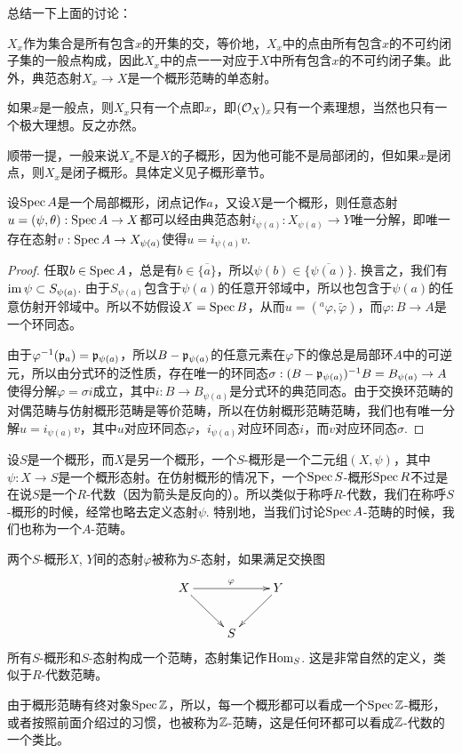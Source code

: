 总结一下上面的讨论：

\begin{pro}
$X_x$作为集合是所有包含$x$的开集的交，等价地，$X_x$中的点由所有包含$x$的不可约闭子集的一般点构成，因此$X_x$中的点一一对应于$X$中所有包含$x$的不可约闭子集。此外，典范态射$X_x\to X$是一个概形范畴的单态射。
\end{pro}

如果$x$是一般点，则$X_x$只有一个点即$x$，即$(\mathcal{O}_X)_x$只有一个素理想，当然也只有一个极大理想。反之亦然。

顺带一提，一般来说$X_x$不是$X$的子概形，因为他可能不是局部闭的，但如果$x$是闭点，则$X_x$是闭子概形。具体定义见子概形章节。

\begin{pro}\label{pro:4.6}
设$\operatorname{Spec} A$是一个局部概形，闭点记作$a$，又设$X$是一个概形，则任意态射$u=(\psi,\theta):\operatorname{Spec} A\to X$都可以经由典范态射$i_{\psi(a)}:X_{\psi(a)}\to Y$唯一分解，即唯一存在态射$v:\operatorname{Spec} A\to X_{\psi(a)}$使得$u=i_{\psi(a)}v$. 
\end{pro}

\begin{proof}
任取$b\in \operatorname{Spec} A$，总是有$b\in\overline{\{a\}}$，所以$\psi(b)\in \overline{\{\psi(a)\}}$. 换言之，我们有$\operatorname{im} \psi\subset S_{\psi(a)}$. 由于$S_{\psi(a)}$包含于$\psi(a)$的任意开邻域中，所以也包含于$\psi(a)$的任意仿射开邻域中。所以不妨假设$X=\operatorname{Spec} B$，从而$u=({}^a\varphi,\widetilde{\varphi})$，而$\varphi:B\to A$是一个环同态。

由于$\varphi^{-1}(\mathfrak{p}_a)=\mathfrak{p}_{\psi(a)}$，所以$B-\mathfrak{p}_{\psi(a)}$的任意元素在$\varphi$下的像总是局部环$A$中的可逆元，所以由分式环的泛性质，存在唯一的环同态$\sigma:(B-\mathfrak{p}_{\psi(a)})^{-1}B=B_{\psi(a)}\to A$使得分解$\varphi=\sigma i$成立，其中$i:B\to B_{\psi(a)}$是分式环的典范同态。由于交换环范畴的对偶范畴与仿射概形范畴是等价范畴，所以在仿射概形范畴范畴，我们也有唯一分解$u=i_{\psi(a)}v$，其中$u$对应环同态$\varphi$，$i_{\psi(a)}$对应环同态$i$，而$v$对应环同态$\sigma$.
\end{proof}

\begin{para}[$S$-概形]
设$S$是一个概形，而$X$是另一个概形，一个$S$-概形是一个二元组$(X,\psi)$，其中$\psi:X\to S$是一个概形态射。在仿射概形的情况下，一个$\operatorname{Spec} S$-概形$\operatorname{Spec} R$不过是在说$S$是一个$R$-代数（因为箭头是反向的）。所以类似于称呼$R$-代数，我们在称呼$S$-概形的时候，经常也略去定义态射$\psi$. 特别地，当我们讨论$\operatorname{Spec} A$-范畴的时候，我们也称为一个$A$-范畴。

两个$S$-概形$X$, $Y$间的态射$\varphi$被称为$S$-态射，如果满足交换图
\[
	\xymatrix{
	X\ar[rr]^\varphi \ar[rd]&&Y\ar[ld]\\
	&S&
	}
\]
所有$S$-概形和$S$-态射构成一个范畴，态射集记作$\operatorname{Hom}_S$. 这是非常自然的定义，类似于$R$-代数范畴。

由于概形范畴有终对象$\operatorname{Spec} \mathbb{Z}$，所以，每一个概形都可以看成一个$\operatorname{Spec} \mathbb{Z}$-概形，或者按照前面介绍过的习惯，也被称为$\mathbb{Z}$-范畴，这是任何环都可以看成$\mathbb{Z}$-代数的一个类比。
\end{para}

